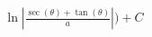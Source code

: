 \documentclass[preview]{standalone}
\begin{document}
\begin{align*}
\ln|\frac{\sec(\theta)+\tan(\theta)}{a}|)+C
\end{align*}
\end{document}
